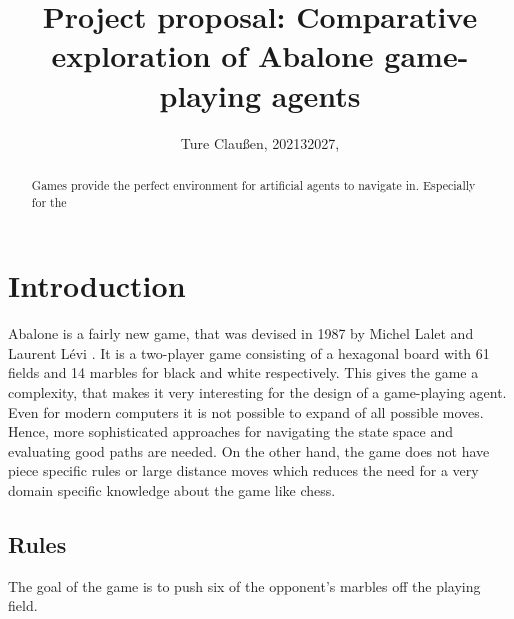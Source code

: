 \documentclass{llncs}
\begin{document}
\title{Project proposal: Comparative exploration of Abalone game-playing agents}
\author{Ture Claußen, 202132027, }

{\def\addcontentsline#1#2#3{}\maketitle} %

\begin{abstract}
  Games provide the perfect environment for artificial agents to navigate in. Especially for the
\end{abstract}

\section{Introduction}

Abalone is a fairly new game, that was devised in 1987 by Michel Lalet and Laurent Lévi \cite{noauthor_abalone_2020}. It is a two-player game consisting of a hexagonal board with 61 fields and 14 marbles for black and white respectively. This gives the game a complexity, that makes it very interesting for the design of a game-playing agent. Even for modern computers it is not possible to expand of all possible moves. Hence, more sophisticated approaches for navigating the state space and evaluating good paths are needed. On the other hand, the game does not have piece specific rules or large distance moves which reduces the need for a very domain specific knowledge about the game like chess.

\subsection{Rules}

The goal of the game is to push six of the opponent's marbles off the playing field.
\end{document}
